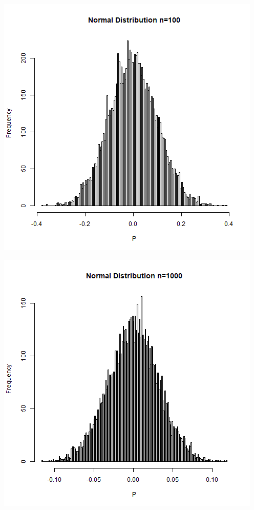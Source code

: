 \documentclass{article}
\begin{document}
\begin{CJK}{UTF8}{gbsn}
\begin{minipage}{0.5\textwidth}
\end{minipage}
\begin{minipage}{0.5\textwidth}
    \includegraphics[scale=0.6]{hist1-3.png}
\end{minipage}
\begin{minipage}{0.5\textwidth}
    \includegraphics[scale=0.6]{hist1-4.png}
\end{minipage}

\end{CJK}
\end{document}
